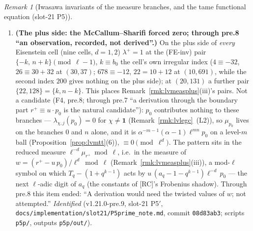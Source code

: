 \documentclass[11pt]{article}
\theoremstyle{remark}
\newtheorem{remark}[theorem]{Remark}
\begin{document}
\begin{remark}[Iwasawa invariants of the measure branches, and the tame functional equation (slot-21 P5)]
\begin{enumerate}
  $(10,37)$, $(16,37)$, $(30,37)$) and S2 (\texttt{MeasureFrozenS2.inc}: $(282,37)$, $(226,103)$, $(10,691)$), both signs, no branch skipped. \emph{Unexplained} (recorded, not derived): the $\lambda=1$ pairs of
  the controls away from the self-dual and near-trivial-zero branches --- $(10,37)$ minus $\{21,25\}$, $(10,47)$ minus $\{13,43\}$ and plus $\{16,40\}$, $(10,67)$ minus $\{31,45\}$, $(10,131)$ minus $\{63,77\}$,
  $(16,37)$ minus $\{21,31\}$ and plus $\{22,30\}$. Each such pair is one congruence $c_0\equiv0\pmod\ell$ on a branch (all of its critical values divisible by $\ell$); a branch with unit-sized
  random coefficients has $\lambda\ge1$ with probability $1/\ell$, and the pairs then come in (FE-inv) orbits, so over the $32$ sign-cells of the controls ($(\ell-1)/4$ orbits each) about $\sum(\ell-1)/(4\ell)\approx7.7$ orbits are
  expected by chance; $7$ are seen ($47$ is a regular prime, so no Eisenstein mechanism is available there). The pairs are therefore consistent with chance and carry no claim (F4).
\item \textbf{(The plus side: the McCallum--Sharifi forced zero; through pre.8 ``an observation, recorded, not derived''.)} On the plus side of \emph{every} Eisenstein cell (nine cells, $d=1,2$) $\lambda^{+}=1$ at the (FE-inv) pair $\{-k,\,n+k\}\pmod{\ell-1}$, $k\equiv b_0$
  the cell's own irregular index ($4\equiv-32$, $26\equiv30+32$ at $(30,37)$; $678\equiv-12$, $22=10+12$ at $(10,691)$, while the second index $200$ gives nothing on the plus side); at $(20,131)$ a further
  pair $\{22,128\}=\{k,n-k\}$. This places Remark~\ref{rmk:lvmeasplus}(iii)'s pairs. Not a candidate (F4, pre.8; through pre.7 ``a derivation through the boundary part $r^{+}\equiv u\cdot p_0$ is the natural
  candidate''): $p_0$ contributes nothing to these branches --- $\lambda_{\chi,j}(p_0)=0$ for $\chi\ne\mathbf1$ (Remark~\ref{rmk:lvlegc}~(L2)), so $\mu_{p_0}$ lives on the branches $0$ and $n$ alone, and it is
  $\alpha^{-m-1}(\alpha-1)\ell^{mn}p_0$ on a level-$m$ ball (Proposition~\ref{prop:lvmtt}(6)), $\equiv0\pmod{\ell^{d}}$. The pattern sits in the reduced measure $\ell^{-d}\mu_{r^{+}}\bmod\ell$, i.e.\ in the
  measure of $w=(r^{+}-u\,p_0)/\ell^{d}\bmod\ell$ (Remark~\ref{rmk:lvmeasplus}(iii)), a mod-$\ell$ symbol on which $T_q-(1+q^{k-1})$ acts by $u\,(a_q-1-q^{k-1})\ell^{-d}\,p_0$ --- the next $\ell$-adic digit of
  $a_q$ (the constants of [RC]'s Frobenius shadow). Through pre.8 this item ended: ``A derivation would need the twisted values of $w$; not attempted.''
  \emph{Identified} (v1.21.0-pre.9, slot-21 P5$'$, \texttt{docs/implementation/slot21/P5prime\_note.md}, commit \texttt{08d83ab3}; scripts \texttt{p5p/}, outputs \texttt{p5p/out/}).

\end{enumerate}
\end{remark}
\end{document}
